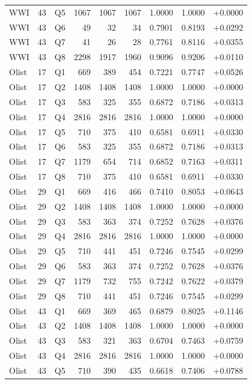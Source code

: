 \documentclass[11pt,letterpaper]{article}
\begin{document}
\begin{longtable}{lrlrrrrrr}
WWI & 43 & Q5 & 1067 & 1067 & 1067 & 1.0000 & 1.0000 & +0.0000\\
WWI & 43 & Q6 & 49 & 32 & 34 & 0.7901 & 0.8193 & +0.0292\\
WWI & 43 & Q7 & 41 & 26 & 28 & 0.7761 & 0.8116 & +0.0355\\
WWI & 43 & Q8 & 2298 & 1917 & 1960 & 0.9096 & 0.9206 & +0.0110\\
Olist & 17 & Q1 & 669 & 389 & 454 & 0.7221 & 0.7747 & +0.0526\\
Olist & 17 & Q2 & 1408 & 1408 & 1408 & 1.0000 & 1.0000 & +0.0000\\
Olist & 17 & Q3 & 583 & 325 & 355 & 0.6872 & 0.7186 & +0.0313\\
Olist & 17 & Q4 & 2816 & 2816 & 2816 & 1.0000 & 1.0000 & +0.0000\\
Olist & 17 & Q5 & 710 & 375 & 410 & 0.6581 & 0.6911 & +0.0330\\
Olist & 17 & Q6 & 583 & 325 & 355 & 0.6872 & 0.7186 & +0.0313\\
Olist & 17 & Q7 & 1179 & 654 & 714 & 0.6852 & 0.7163 & +0.0311\\
Olist & 17 & Q8 & 710 & 375 & 410 & 0.6581 & 0.6911 & +0.0330\\
Olist & 29 & Q1 & 669 & 416 & 466 & 0.7410 & 0.8053 & +0.0643\\
Olist & 29 & Q2 & 1408 & 1408 & 1408 & 1.0000 & 1.0000 & +0.0000\\
Olist & 29 & Q3 & 583 & 363 & 374 & 0.7252 & 0.7628 & +0.0376\\
Olist & 29 & Q4 & 2816 & 2816 & 2816 & 1.0000 & 1.0000 & +0.0000\\
Olist & 29 & Q5 & 710 & 441 & 451 & 0.7246 & 0.7545 & +0.0299\\
Olist & 29 & Q6 & 583 & 363 & 374 & 0.7252 & 0.7628 & +0.0376\\
Olist & 29 & Q7 & 1179 & 732 & 755 & 0.7242 & 0.7622 & +0.0379\\
Olist & 29 & Q8 & 710 & 441 & 451 & 0.7246 & 0.7545 & +0.0299\\
Olist & 43 & Q1 & 669 & 369 & 465 & 0.6879 & 0.8025 & +0.1146\\
Olist & 43 & Q2 & 1408 & 1408 & 1408 & 1.0000 & 1.0000 & +0.0000\\
Olist & 43 & Q3 & 583 & 321 & 363 & 0.6704 & 0.7463 & +0.0759\\
Olist & 43 & Q4 & 2816 & 2816 & 2816 & 1.0000 & 1.0000 & +0.0000\\
Olist & 43 & Q5 & 710 & 390 & 435 & 0.6618 & 0.7406 & +0.0788\\

\end{longtable}
\end{document}
